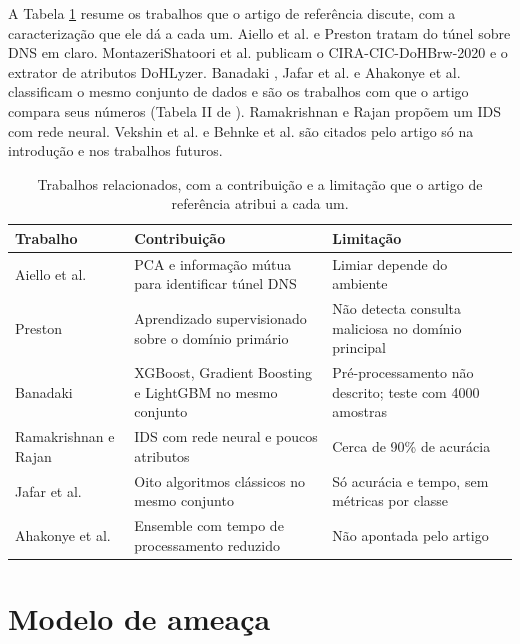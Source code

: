 \documentclass[conference]{IEEEtran}
\begin{document}
A Tabela \ref{tab:relacionados} resume os trabalhos que o artigo de referência discute, com a caracterização que ele dá a cada um. Aiello et al. \cite{aiello2013} e Preston \cite{preston2019} tratam do túnel sobre DNS em claro. MontazeriShatoori et al. \cite{montazeri2020} publicam o CIRA-CIC-DoHBrw-2020 e o extrator de atributos DoHLyzer. Banadaki \cite{banadaki2020}, Jafar et al. \cite{jafar2021} e Ahakonye et al. \cite{ahakonye2022} classificam o mesmo conjunto de dados e são os trabalhos com que o artigo compara seus números (Tabela II de \cite{zebin2022}). Ramakrishnan e Rajan \cite{ramakrishnan2022} propõem um IDS com rede neural. Vekshin et al. \cite{vekshin2020} e Behnke et al. \cite{behnke2021} são citados pelo artigo só na introdução e nos trabalhos futuros.

\begin{table}[!t]
\centering
\caption{Trabalhos relacionados, com a contribuição e a limitação que o artigo de referência atribui a cada um.}
\label{tab:relacionados}
\footnotesize\setlength{\tabcolsep}{3pt}
\begin{tabular}{p{1.95cm}p{3.0cm}p{3.0cm}}
\hline
\textbf{Trabalho} & \textbf{Contribuição} & \textbf{Limitação} \\ \hline
Aiello et al. \cite{aiello2013} & PCA e informação mútua para identificar túnel DNS & Limiar depende do ambiente \\
Preston \cite{preston2019} & Aprendizado supervisionado sobre o domínio primário & Não detecta consulta maliciosa no domínio principal \\
Banadaki \cite{banadaki2020} & XGBoost, Gradient Boosting e LightGBM no mesmo conjunto & Pré-processamento não descrito; teste com 4000 amostras \\
Ramakrishnan e Rajan \cite{ramakrishnan2022} & IDS com rede neural e poucos atributos & Cerca de 90\% de acurácia \\
Jafar et al. \cite{jafar2021} & Oito algoritmos clássicos no mesmo conjunto & Só acurácia e tempo, sem métricas por classe \\
Ahakonye et al. \cite{ahakonye2022} & Ensemble com tempo de processamento reduzido & Não apontada pelo artigo \\
\hline
\end{tabular}
\end{table}

\section{Modelo de ameaça}
\end{document}
